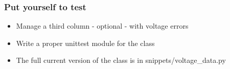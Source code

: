 \documentclass[9pt]{beamer}
\begin{document}
\begin{frame}
  \frametitle{Put yourself to test}
  \begin{itemize}
    \item Manage a third column - optional - with voltage errors
    \item Write a proper unittest module for the class
    \item The full current version of the class is in snippets/voltage\_data.py
  \end{itemize}  
  
\end{frame}


%  
%  
% 
\end{document}
